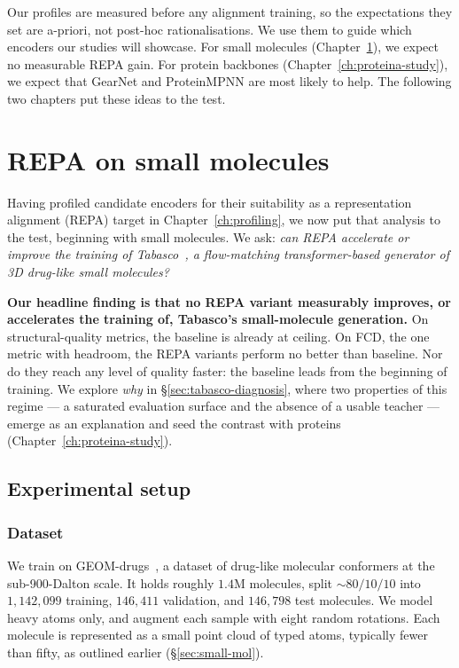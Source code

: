 \documentclass[12pt,a4paper,twoside]{report}
\begin{document}
Our profiles are measured before any alignment training, so the expectations they set are a-priori, not post-hoc rationalisations. We use them to guide which encoders our studies will showcase. For small molecules (Chapter~\ref{ch:tabasco-study}), we expect no measurable REPA gain. For protein backbones (Chapter~\ref{ch:proteina-study}), we expect that GearNet and ProteinMPNN are most likely to help. The following two chapters put these ideas to the test.

\chapter{REPA on small molecules}
\label{ch:tabasco-study}


Having profiled candidate encoders for their suitability as a representation alignment (REPA) target in Chapter~\ref{ch:profiling}, we now put that analysis to the test, beginning with small molecules. We ask: \emph{can REPA accelerate or improve the training of Tabasco~\cite{Tabasco}, a flow-matching transformer-based generator of 3D drug-like small molecules?}

\textbf{Our headline finding is that no REPA variant measurably improves, or accelerates the training of, Tabasco's small-molecule generation.} On structural-quality metrics, the baseline is already at ceiling. On FCD, the one metric with headroom, the REPA variants perform no better than baseline. Nor do they reach any level of quality faster: the baseline leads from the beginning of training. We explore \emph{why} in \S\ref{sec:tabasco-diagnosis}, where two properties of this regime --- a saturated evaluation surface and the absence of a usable teacher --- emerge as an explanation and seed the contrast with proteins (Chapter~\ref{ch:proteina-study}).

\section{Experimental setup}
\label{sec:tabasco-setup}

\subsection{Dataset}
\label{sec:tabasco-data}

We train on GEOM-drugs~\cite{GEOMdrugs}, a dataset of drug-like molecular conformers at the sub-900-Dalton scale. It holds roughly $1.4$M molecules, split ${\sim}80/10/10$ into $1{,}142{,}099$ training, $146{,}411$ validation, and $146{,}798$ test molecules. We model heavy atoms only, and augment each sample with eight random rotations. Each molecule is represented as a small point cloud of typed atoms, typically fewer than fifty, as outlined earlier (\S\ref{sec:small-mol}).
\end{document}
